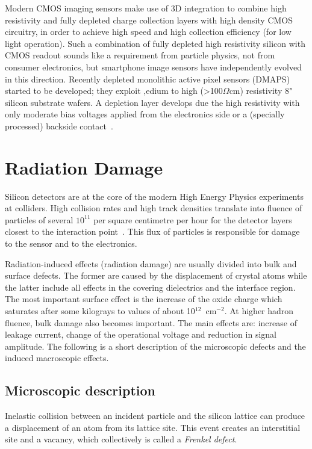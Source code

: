 Modern CMOS imaging sensors make use of 3D integration to combine high resistivity and 
fully depleted charge collection layers with high density CMOS circuitry, in order to achieve high speed 
and high collection efficiency (for low light operation). Such a combination of fully depleted high 
resistivity silicon with CMOS readout sounds like a requirement from particle physics, not from 
consumer electronics, but smartphone image sensors have independently evolved in this 
direction. Recently depleted monolithic active pixel sensors 
(DMAPS) started to be developed; they exploit ,edium to high (>100$\Omega$cm) resistivity 8" silicon substrate wafers. A depletion layer develops due the high resistivity with only moderate bias voltages applied from the electronics side or a (specially processed) backside 
contact~\cite{Garcia-Sciveres:2017ymt}.

\section{Radiation Damage}
\label{sec:RadDam}

Silicon detectors are at the core of the modern High Energy Physics experiments at colliders. 
High collision rates 
and high track densities translate into fluence of particles of several $10^{11}$ per square centimetre 
per hour for the detector layers closest to the interaction point~\cite{rossi2006pixel}. This flux of 
particles is responsible for damage to the sensor and to the electronics. 

Radiation-induced effects (radiation damage) are usually divided into bulk and surface defects. The 
former are caused by the displacement of crystal atoms while the latter include all effects in the 
covering dielectrics and the interface region. The most important surface effect is the increase of the 
oxide charge which saturates after some kilograys to values of about 10$^{12}$~cm$^{-2}$. 
At higher hadron fluence, bulk damage also becomes important. The main effects are: increase of 
leakage current, change of the operational voltage and reduction in signal amplitude. 
The following is a short description of the microscopic defects and the induced macroscopic effects.

\subsection{Microscopic description}
Inelastic collision between an incident particle and the silicon lattice can produce a displacement 
of an atom from its lattice site. This event creates an interstitial site and a vacancy, which 
collectively is called a {\it Frenkel defect}. 

